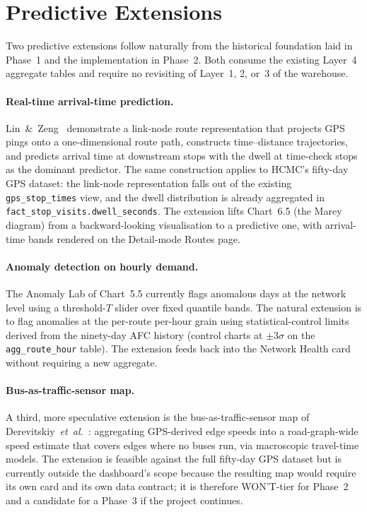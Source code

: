 \section{Predictive Extensions}
\label{sec:future:predictive}

Two predictive extensions follow naturally from the historical
foundation laid in Phase~1 and the implementation in Phase~2.
Both consume the existing Layer~4 aggregate tables and require
no revisiting of Layer~1, 2, or~3 of the warehouse.

\paragraph{Real-time arrival-time prediction.}
Lin~\&~Zeng~\cite{linzeng2014} demonstrate a link-node route
representation that projects GPS pings onto a one-dimensional
route path, constructs time--distance trajectories, and
predicts arrival time at downstream stops with the dwell at
time-check stops as the dominant predictor. The same
construction applies to HCMC's fifty-day GPS dataset: the
link-node representation falls out of the existing
\texttt{gps\_stop\_times} view, and the dwell distribution is
already aggregated in \texttt{fact\_stop\_visits.dwell\_seconds}.
The extension lifts Chart~6.5 (the Marey diagram) from a
backward-looking visualisation to a predictive one, with
arrival-time bands rendered on the Detail-mode Routes page.

\paragraph{Anomaly detection on hourly demand.}
The Anomaly Lab of Chart~5.5 currently flags anomalous days at
the network level using a threshold-$T$ slider over fixed
quantile bands. The natural extension is to flag anomalies at
the per-route per-hour grain using statistical-control limits
derived from the ninety-day AFC history (control charts at
$\pm 3\sigma$ on the \texttt{agg\_route\_hour} table). The
extension feeds back into the Network Health card without
requiring a new aggregate.

\paragraph{Bus-as-traffic-sensor map.}
A third, more speculative extension is the bus-as-traffic-sensor
map of
Derevitskiy~\textit{et~al.}~\cite{derevitskiy2016}: aggregating
GPS-derived edge speeds into a road-graph-wide speed estimate
that covers edges where no buses run, via macroscopic
travel-time models. The extension is feasible against the full
fifty-day GPS dataset but is currently outside the dashboard's
scope because the resulting map would require its own card and
its own data contract; it is therefore WON'T-tier for Phase~2
and a candidate for a Phase~3 if the project continues.
